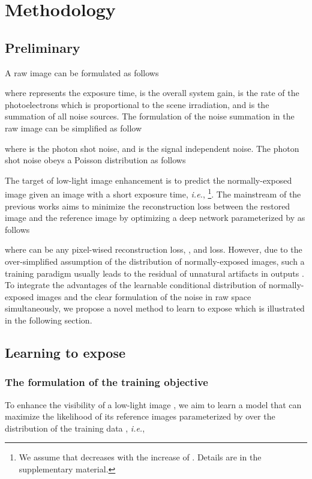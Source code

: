 \documentclass[10pt,twocolumn,letterpaper]{article}
\def\ie{\textit{i.e.}}
\begin{document}
\section{Methodology}
\vspace{-0.1cm}
\subsection{Preliminary}
\vspace{-0.1cm}
A raw image  can be formulated as follows

where  represents the exposure time,  is the overall system gain,  is the rate of the photoelectrons which is proportional to the scene irradiation, and  is the summation of all noise sources. 
The formulation of the noise summation  in the raw image can be simplified as follow

where  is the photon shot noise, and  is the signal independent noise. The photon shot noise obeys a Poisson distribution as follows

The target of low-light image enhancement is to predict the normally-exposed image  given an image  with a short exposure time, \ie,  \footnote{We assume that  decreases with the increase of . Details are in the supplementary material.}. 
The mainstream of the previous works aims to minimize the reconstruction loss between the restored image and the reference image by optimizing a deep network parameterized by  as follows

where  can be any pixel-wised reconstruction loss, \eg,  and  loss. 
However, due to the over-simplified assumption of the distribution of normally-exposed images, such a training paradigm usually leads to the residual of unnatural artifacts in outputs \cite{wang2021low}. To integrate the advantages of the learnable conditional distribution of normally-exposed images and the clear formulation of the noise in raw space simultaneously, we propose a novel method to learn to expose which is illustrated in the following section.





\subsection{Learning to expose}
\vspace{-0.05cm}
\subsubsection{The formulation of the training objective}
\vspace{-0.05cm}
To enhance the visibility of a low-light image , we aim to learn a model  that can maximize the likelihood of its reference images  parameterized by  over the distribution of the training data , \ie,
\end{document}
